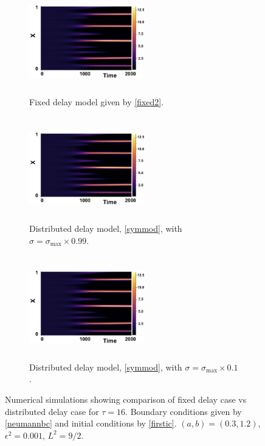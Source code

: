 \begin{figure}[H]
    \centering
    \begin{subfigure}[t]{0.32\textwidth}
        \centering
        \includegraphics[width=5cm,height=4.5cm]{dist2t16sigmax.png}
        \caption{Fixed delay model given by \eqref{fixed2}.}
        \label{}
    \end{subfigure}
    \hfill
    \begin{subfigure}[t]{0.32\textwidth}
        \centering
        \includegraphics[width=5cm,height=4.5cm]{dist2t16sigmax.png}
        \caption{Distributed delay model, \eqref{symmod}, with $\sigma=\sigma_{\max}\times0.99$.}
        \label{}
    \end{subfigure}
    \hfill
    \begin{subfigure}[t]{0.32\textwidth}
        \centering
        \includegraphics[width=5cm,height=4.5cm]{dist2t16sigmax.png}
        \caption{Distributed delay model, \eqref{symmod}, with $\sigma=\sigma_{\max}\times0.1$.}
        \label{}
    \end{subfigure}
    \caption{Numerical simulations showing comparison of fixed delay case vs distributed delay case for $\tau=16$. Boundary conditions given by \eqref{neumannbc} and initial conditions by \eqref{firstic}. $(a,b)=(0.3,1.2)$, $\epsilon^2=0.001$, $L^2=9/2$.}
    \label{fig:distres4}
\end{figure}

